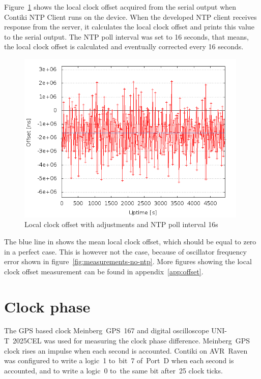 Figure~\ref{fig:measurements-ntp-serial} shows the local clock offset
acquired from the serial output when Contiki NTP Client runs on the device.
When the developed NTP client receives response from the server,
it calculates the local clock offset and prints this value to the serial output.
The NTP poll interval was set to 16 seconds, that means, the local clock offset
is calculated and eventually corrected every 16 seconds.
\begin{figure}[H]
  \centering
  \includegraphics[width=11cm,keepaspectratio]{fig/poll-16s.png}
  \caption{Local clock offset with adjustments and NTP poll interval 16s}
  \label{fig:measurements-ntp-serial}
\end{figure}
The blue line in shows the mean local clock offset,
which should be equal to zero in a perfect case.
This is however not the case, because of oscillator frequency error
shown in figure~\ref{fig:measurements-no-ntp}.
More figures showing the local clock offset measurement
can be found in appendix~\ref{app:offset}.


\section{Clock phase}
The GPS based clock Meinberg~GPS~167 and digital oscilloscope UNI-T~2025CEL
was used for measuring the clock phase difference.
Meinberg~GPS clock rises an impulse when each second is accounted.
Contiki on AVR~Raven was configured to write a logic~1
to~bit~7 of~Port~D when each second is accounted,
and to write a logic~0 to~the same bit after~25 clock ticks.

